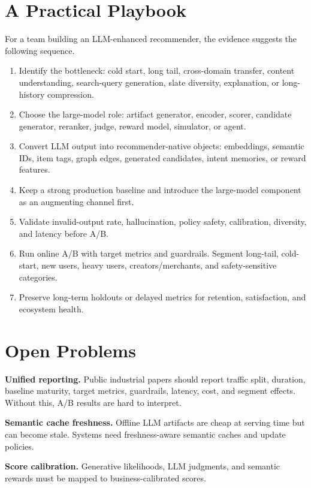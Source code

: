 \documentclass[11pt]{article}
\begin{document}
\section{A Practical Playbook}

For a team building an LLM-enhanced recommender, the evidence suggests the following sequence.

\begin{enumerate}
  \item Identify the bottleneck: cold start, long tail, cross-domain transfer, content understanding, search-query generation, slate diversity, explanation, or long-history compression.
  \item Choose the large-model role: artifact generator, encoder, scorer, candidate generator, reranker, judge, reward model, simulator, or agent.
  \item Convert LLM output into recommender-native objects: embeddings, semantic IDs, item tags, graph edges, generated candidates, intent memories, or reward features.
  \item Keep a strong production baseline and introduce the large-model component as an augmenting channel first.
  \item Validate invalid-output rate, hallucination, policy safety, calibration, diversity, and latency before A/B.
  \item Run online A/B with target metrics and guardrails. Segment long-tail, cold-start, new users, heavy users, creators/merchants, and safety-sensitive categories.
  \item Preserve long-term holdouts or delayed metrics for retention, satisfaction, and ecosystem health.
\end{enumerate}

\section{Open Problems}

\textbf{Unified reporting.} Public industrial papers should report traffic split, duration, baseline maturity, target metrics, guardrails, latency, cost, and segment effects. Without this, A/B results are hard to interpret.

\textbf{Semantic cache freshness.} Offline LLM artifacts are cheap at serving time but can become stale. Systems need freshness-aware semantic caches and update policies.

\textbf{Score calibration.} Generative likelihoods, LLM judgments, and semantic rewards must be mapped to business-calibrated scores.
\end{document}
